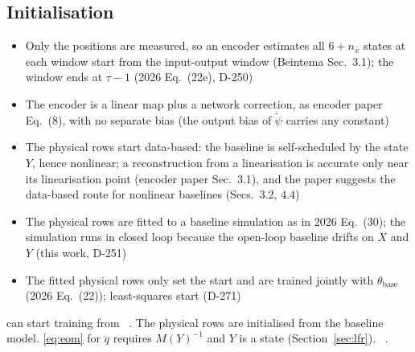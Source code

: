 \subsection{Initialisation}\label{sec:aug_encoder}
\ifdraft
\begin{itemize}
\item Only the positions are measured, so an encoder estimates all $6+n_{\bar x}$ states at each window start from the input-output window (Beintema Sec.~3.1); the window ends at $\tau-1$ (2026 Eq.~(22e), D-250)
\item The encoder is a linear map plus a network correction, as encoder paper Eq.~(8), with no separate bias (the output bias of $\tilde\psi$ carries any constant)
\item The physical rows start data-based: the baseline is self-scheduled by the state $Y$, hence nonlinear; a reconstruction from a linearisation is accurate only near its linearisation point (encoder paper Sec.~3.1), and the paper suggests the data-based route for nonlinear baselines (Secs.~3.2, 4.4)
\item The physical rows are fitted to a baseline simulation as in 2026 Eq.~(30); the simulation runs in closed loop because the open-loop baseline drifts on $X$ and $Y$ (this work, D-251)
\item The fitted physical rows only set the start and are trained jointly with $\theta_{\mathrm{base}}$ (2026 Eq.~(22)); least-squares start (D-271)
\end{itemize}
\fi
{} can  start
training from 
~\cite[Sec.~5.4]{hoekstra2026lfr}.
%
The physical rows are initialised from the baseline model.
 \eqref{eq:eom} for $\ddot q$ requires $M(Y)^{-1}$
and $Y$ is a state (Section~\ref{sec:lfr}).
~\cite[Sec.~3.1]{hoekstra2026encoder}.
